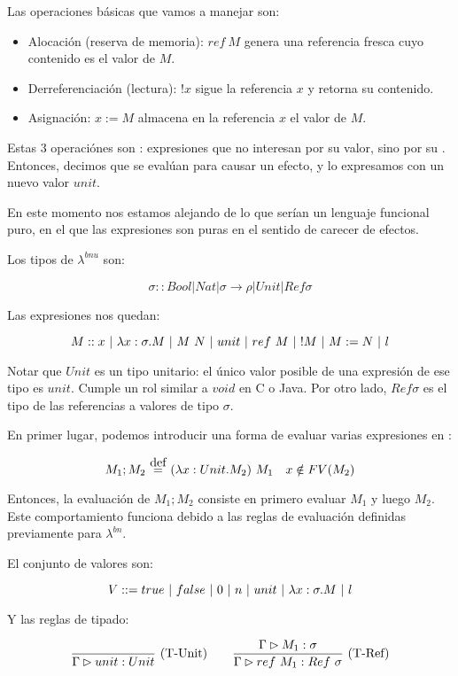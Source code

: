 Las operaciones básicas que vamos a manejar son:
\begin{itemize}
  \item Alocación (reserva de memoria): $ref\ M$ genera una referencia fresca cuyo contenido es el valor de $M$.
  \item Derreferenciación (lectura): $!x$ sigue la referencia $x$ y retorna su contenido.
  \item Asignación: $x := M$ almacena en la referencia $x$ el valor de $M$.
\end{itemize}

Estas 3 operaciónes son : expresiones que no interesan por su valor, sino por su . Entonces, decimos que se evalúan para causar un efecto, y lo expresamos con un nuevo valor $unit$.

En este momento nos estamos alejando de lo que serían un lenguaje funcional puro, en el que las expresiones son puras en el sentido de carecer de efectos.

Los tipos de $\lambda^{bnu}$ son:

\[\sigma :: Bool \vert Nat \vert \sigma\to\rho \vert Unit \vert Ref \sigma \]

Las expresiones nos quedan:

\[M :: x \ |\  \lambda x:\sigma.M \ |\  M\ N \ |\  unit \ |\  ref\ M \ |\  !M \ |\  M := N \ |\  l \]

Notar que $Unit$ es un tipo unitario: el único valor posible de una expresión de ese tipo es $unit$. Cumple un rol similar a $void$ en C o Java. Por otro lado, $Ref \sigma$ es el tipo de las referencias a valores de tipo $\sigma$.

En primer lugar, podemos introducir una forma de evaluar varias expresiones en :

\[M_1; M_2 \eqdef \app{(\abs{x}{Unit}{M_2})}{M_1}\quad x\notin FV(M_2)\]

Entonces, la evaluación de $M_1; M_2$ consiste en primero evaluar $M_1$  y luego $M_2$. Este comportamiento funciona debido a las reglas de evaluación definidas previamente para $\lambda^{bn}$.

El conjunto de valores son:

\[V ::= true \ |\  false \ |\  0 \ |\  n \ |\  unit \ |\  \lambda x:\sigma.M \ |\  l \]

Y las reglas de tipado:

\[\deriv{}{\Gamma \rhd unit : Unit}{T-Unit}\quad\quad \deriv{\Gtipa{M_1}{\sigma}}{\Gtipa{ref\ M_1}{Ref\ \sigma}}{T-Ref}\]


